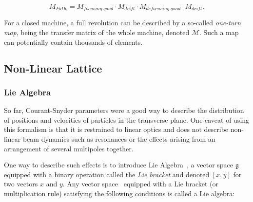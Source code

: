 \begin{equation}
    M_{FoDo} = M_{focusing\;quad} \cdot M_{drift} \cdot M_{defocusing\;quad} \cdot M_{drift}.
\end{equation}

For a closed machine, a full revolution can be described by a so-called \textit{one-turn map}, being
the transfer matrix of the whole machine, denoted $\mathcal{M}$. Such a map can potentially contain
thousands of elements.


\subsection{Non-Linear Lattice}

\subsubsection{Lie Algebra}

So far, Courant-Snyder parameters were a good way to describe the distribution of positions and
velocities of particles in the transverse plane. One caveat of using this formalism is that it is 
restrained to linear optics and does not describe non-linear beam dynamics such as resonances or 
the effects arising from an arrangement of several multipoles together.

One way to describe such effects is to introduce Lie Algebra~\cite{dragt_overview_2013}, a vector
space $\mathfrak{g}$ equipped with a binary operation called the \textit{Lie bracket} and denoted
$[x, y]$ for two vectors $x$ and $y$. Any vector space ~equipped with a Lie bracket (or
multiplication rule) satisfying the following conditions is called a Lie algebra:

